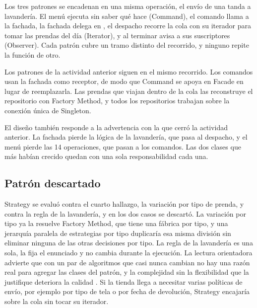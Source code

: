 Los tres patrones se encadenan en una misma operación, el envío de una tanda a lavandería. El menú ejecuta  sin saber qué hace (Command), el comando llama a la fachada, la fachada delega en , el despacho recorre la cola con su iterador para tomar las prendas del día (Iterator), y al terminar avisa a sus suscriptores (Observer). Cada patrón cubre un tramo distinto del recorrido, y ninguno repite la función de otro.

Los patrones de la actividad anterior siguen en el mismo recorrido. Los comandos usan la fachada como receptor, de modo que Command se apoya en Facade en lugar de reemplazarla. Las prendas que viajan dentro de la cola las reconstruye el repositorio con Factory Method, y todos los repositorios trabajan sobre la conexión única de Singleton.

El diseño también responde a la advertencia con la que cerró la actividad anterior. La fachada pierde la lógica de la lavandería, que pasa al despacho, y el menú pierde las 14 operaciones, que pasan a los comandos. Las dos clases que más habían crecido quedan con una sola responsabilidad cada una.

\subsection{Patrón descartado}\label{sec:patron-descartado}

Strategy se evaluó contra el cuarto hallazgo, la variación por tipo de prenda, y contra la regla de la lavandería, y en los dos casos se descartó. La variación por tipo ya la resuelve Factory Method, que tiene una fábrica por tipo, y una jerarquía paralela de estrategias por tipo duplicaría esa misma división sin eliminar ninguna de las otras decisiones por tipo. La regla de la lavandería es una sola, la fija el enunciado y no cambia durante la ejecución. La lectura orientadora advierte que con un par de algoritmos que casi nunca cambian no hay una razón real para agregar las clases del patrón, y la complejidad sin la flexibilidad que la justifique deteriora la calidad . Si la tienda llega a necesitar varias políticas de envío, por ejemplo por tipo de tela o por fecha de devolución, Strategy encajaría sobre la cola sin tocar su iterador.

